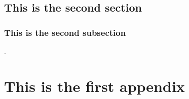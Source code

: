 \documentclass[12pt, a4paper, openright, notitlepage]{report} %
\begin{document}
	\section{This is the second section}
	\lipsum
	\subsection{This is the second subsection}
	\lipsum \cite{lovecraft2016el}. 
	
	\cleardoublepage
	\appendix
	
	\chapter{This is the first appendix}
	
	\cleardoublepage
	\printbibliography[heading=bibintoc] %
\end{document}
